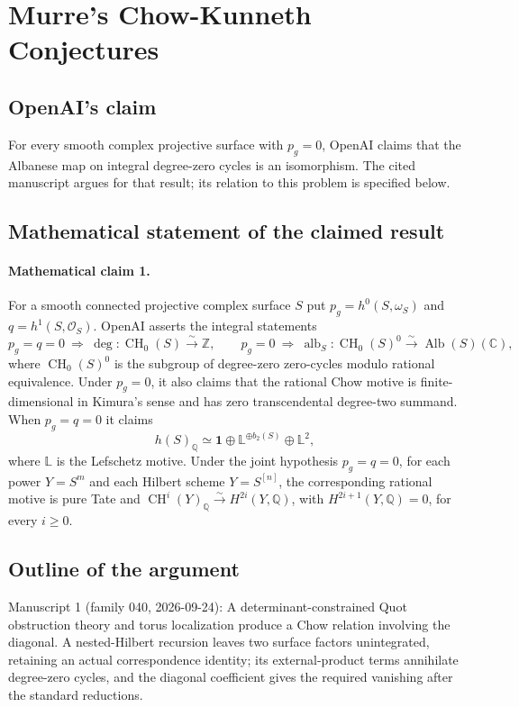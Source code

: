 \documentclass[11pt]{article}
\begin{document}
\section*{Murre's Chow-Kunneth Conjectures}

\subsection{OpenAI's claim}
For every smooth complex projective surface with $p_g=0$, OpenAI claims that the Albanese map on integral degree-zero cycles is an isomorphism. The cited manuscript argues for that result; its relation to this problem is specified below.

\subsection{Mathematical statement of the claimed result}
\paragraph{Mathematical claim 1.} For a smooth connected projective complex surface $S$ put $p_g=h^0(S,\omega_S)$ and $q=h^1(S,\mathcal O_S)$. OpenAI asserts the integral statements
\[
p_g=q=0\ \Longrightarrow\ \deg:\operatorname{CH}_0(S)\xrightarrow{\sim}\mathbb Z,
\qquad
p_g=0\ \Longrightarrow\ \operatorname{alb}_S:\operatorname{CH}_0(S)^0\xrightarrow{\sim}\operatorname{Alb}(S)(\mathbb C),
\]
where $\operatorname{CH}_0(S)^0$ is the subgroup of degree-zero zero-cycles modulo rational equivalence. Under $p_g=0$, it also claims that the rational Chow motive is finite-dimensional in Kimura's sense and has zero transcendental degree-two summand. When $p_g=q=0$ it claims
\[
h(S)_{\mathbb Q}\simeq\mathbf1\oplus\mathbb L^{\oplus b_2(S)}\oplus\mathbb L^2,
\]
where $\mathbb L$ is the Lefschetz motive. Under the joint hypothesis $p_g=q=0$, for each power $Y=S^m$ and each Hilbert scheme $Y=S^{[n]}$, the corresponding rational motive is pure Tate and $\operatorname{CH}^i(Y)_{\mathbb Q}\xrightarrow{\sim}H^{2i}(Y,\mathbb Q)$, with $H^{2i+1}(Y,\mathbb Q)=0$, for every $i\ge0$.

\subsection{Outline of the argument}
Manuscript 1 (family 040, 2026-09-24): A determinant-constrained Quot obstruction theory and torus localization produce a Chow relation involving the diagonal. A nested-Hilbert recursion leaves two surface factors unintegrated, retaining an actual correspondence identity; its external-product terms annihilate degree-zero cycles, and the diagonal coefficient gives the required vanishing after the standard reductions.
\end{document}
